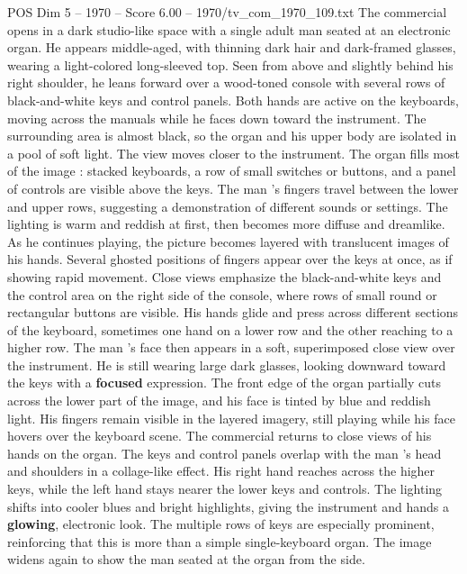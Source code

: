 \begin{textsample}{POS Dim 5 – 1970 – Score 6.00 – 1970/tv\_com\_1970\_109.txt}  \label{ex:f5_pos_084}
The commercial opens in a dark studio-like space with a single adult man seated at an electronic organ.
He appears middle-aged, with thinning dark hair and dark-framed glasses, wearing a light-colored long-sleeved top.
Seen from above and slightly behind his right shoulder, he leans forward over a wood-toned console with several rows of black-and-white keys and control panels.
Both hands are active on the keyboards, moving across the manuals while he faces down toward the instrument.
The surrounding area is almost black, so the organ and his upper body are isolated in a pool of soft light.
The view moves closer to the instrument.
The organ fills most of the image : stacked keyboards, a row of small switches or buttons, and a panel of controls are visible above the keys.
The man ’s fingers travel between the lower and upper rows, suggesting a demonstration of different sounds or settings.
The lighting is warm and reddish at first, then becomes more diffuse and dreamlike.
As he continues playing, the picture becomes layered with translucent images of his hands.
Several ghosted positions of fingers appear over the keys at once, as if showing rapid movement.
Close views emphasize the black-and-white keys and the control area on the right side of the console, where rows of small round or rectangular buttons are visible.
His hands glide and press across different sections of the keyboard, sometimes one hand on a lower row and the other reaching to a higher row.
The man ’s face then appears in a soft, superimposed close view over the instrument.
He is still wearing large dark glasses, looking downward toward the keys with a \textbf{focused} expression.
The front edge of the organ partially cuts across the lower part of the image, and his face is tinted by blue and reddish light.
His fingers remain visible in the layered imagery, still playing while his face hovers over the keyboard scene.
The commercial returns to close views of his hands on the organ.
The keys and control panels overlap with the man ’s head and shoulders in a collage-like effect.
His right hand reaches across the higher keys, while the left hand stays nearer the lower keys and controls.
The lighting shifts into cooler blues and bright highlights, giving the instrument and hands a \textbf{glowing}, electronic look.
The multiple rows of keys are especially prominent, reinforcing that this is more than a simple single-keyboard organ.
The image widens again to show the man seated at the organ from the side.

\end{textsample}
